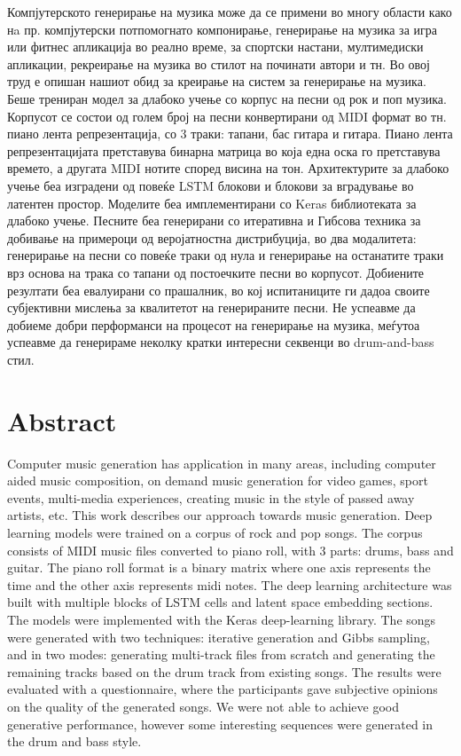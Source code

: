 Компјутерското генерирање на музика може да се примени во многу области како нa пр. компјутерски потпомогнато компонирање, генерирање на музика за игра или фитнес апликација во реално време, за спортски настани, мултимедиски апликации, рекреирање на музика во стилот на починати автори и тн. Во овој труд е опишан нашиот обид за креирање на систем за генерирање на музика. Беше трениран модел за длабоко учење со корпус на песни од рок и поп музика. Корпусот се состои од голем број на песни конвертирани од MIDI формат во тн. пиано лента репрезентација, со 3 траки: тапани, бас гитара и гитара. Пиано лента репрезентацијата претставува бинарна матрица во која една оска го претставува времето, а другата MIDI нотите според висина на тон. 
Архитектурите за длабоко учење беа изградени од повеќе LSTM блокови и блокови за вградување во латентен простор. Моделите беа имплементирани со Keras библиотеката за длабоко учење. 
Песните беа генерирани со итеративна и Гибсова техника за добивање на примероци од веројатностна дистрибуција, во два модалитета: генерирање на песни со повеќе траки од нула и генерирање на останатите траки врз основа на трака со тапани од постоечките песни во корпусот.
Добиените резултати беа евалуирани со прашалник, во кој испитаниците ги дадоа своите субјективни мислења за квалитетот на генерираните песни. Не успеавме да добиеме добри перформанси на процесот на генерирање на музика, меѓутоа успеавме да генерираме неколку кратки интересни секвенци во drum-and-bass стил.

\chapter*{Abstract}

Computer music generation has application in many areas, including computer aided music composition, on demand music generation for video games, sport events, multi-media experiences, creating music in the style of passed away artists, etc.
This work describes our approach towards music generation. Deep learning models were trained on a corpus of rock and pop songs.
The corpus consists of MIDI music files converted to piano roll, with 3 parts: drums, bass and guitar. The piano roll format is a binary matrix where one axis represents the time and the other axis represents midi notes.
The deep learning architecture was built with multiple blocks of LSTM cells and latent space embedding sections. The models were implemented with the Keras deep-learning library. The songs were generated with two techniques: iterative generation and Gibbs sampling, and in two modes: generating multi-track files from scratch and generating the remaining tracks based on the drum track from existing songs.
The results were evaluated with a questionnaire, where the participants gave subjective opinions on the quality of the generated songs. We were not able to achieve good generative performance, however some interesting sequences were generated in the drum and bass style.

